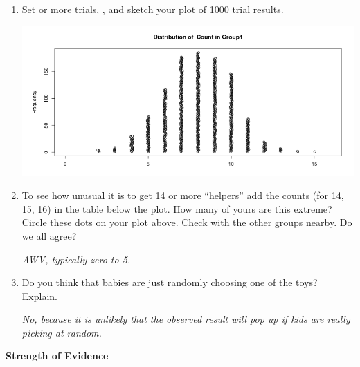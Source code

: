 \begin{enumerate}
\begin{key}
{\it 12 in my first, 8 in my second }
\end{key}

    \item  Set   or more trials,  , and   
              sketch your plot of 1000 trial results. 
\begin{students}
  \vspace{4cm}
\end{students}

\begin{key}
    \includegraphics[width=.8\linewidth]{../plots/Helper16.png}
\end{key}
\item To see how unusual it is to get 14 or more ``helpers'' add the
  counts (for 14, 15, 16) in the table below the plot.
   How many of yours are this extreme? Circle
  these dots on your plot above. Check with the other groups
  nearby. Do we all agree?
\begin{students}
  \vspace{1.5cm}
\end{students}

\begin{key}
{\it  AWV, typically zero to 5.
}
\end{key}
\item  Do you think that babies are just randomly choosing one of
      the toys? Explain.
\begin{students}
  \vspace{2.5cm}
\end{students}

\begin{key}
  {\it No, because it is unlikely that the observed result will pop up
    if  kids are really picking at random. }
\end{key}

  \end{enumerate}
\begin{center}
        {\large\bf Strength of Evidence}
 \end{center}
